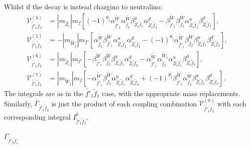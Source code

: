 \documentclass[final,3p,times,pdflatex]{elsarticle}
\begin{document}
Whilst if the decay is instead chargino to neutralino:
\begin{align}
\mathcal{V}_{\tilde{f'}_1 \tilde{f}_2}^{(4)} &= |m_{\tilde{Z}_i}| m_{f} \left[(-1)^{\theta_j}\alpha_{\tilde{f'}_1}^{\tilde{W}} \alpha_{\tilde{f}_2}^{\tilde{W}} \beta_{\tilde{Z}_i \tilde{f}_1}^{u} \alpha_{\tilde{Z}_i \tilde{f}_2}^{d} - \beta_{\tilde{f'}_1}^{\tilde{W}} \beta_{\tilde{f}_2}^{\tilde{W}} \alpha_{\tilde{Z}_i \tilde{f}_1}^{u} \beta_{\tilde{Z}_i \tilde{f}_2}^{d}\right] ,\\
\mathcal{V}_{\tilde{f'}_1 \tilde{f}_2}^{(5)} &= -|m_{\tilde{W}_j}|m_{f'} \left[\alpha_{\tilde{f}_2}^{\tilde{W}} \beta_{\tilde{f'}_1}^{\tilde{W}} \alpha_{\tilde{Z}_i \tilde{f}_1}^{u} \alpha_{\tilde{Z}_i \tilde{f}_2}^{d} -(-1)^{\theta_j} \alpha_{\tilde{f'}_1}^{\tilde{W}} \beta_{\tilde{f}_2}^{\tilde{W}} \beta_{\tilde{Z}_i \tilde{f}_1}^{u} \beta_{\tilde{Z}_i \tilde{f}_2}^{d}\right],\\
\mathcal{V}_{\tilde{f'}_1 \tilde{f}_2}^{(6)} &= |m_{\tilde{Z}_i}| m_{f'}\left[-\beta_{\tilde{f'}_1}^{\tilde{W}}\beta_{\tilde{f}_2}^{\tilde{W}} \beta_{\tilde{Z}_i \tilde{f}_1}^{u} \alpha_{\tilde{Z}_i \tilde{f}_2}^{d}  - \alpha_{\tilde{f'}_1}^{\tilde{W}} \alpha_{\tilde{f}_2}^{\tilde{W}_1} \alpha_{\tilde{Z}_i \tilde{f}_1}^{u} \beta_{\tilde{Z}_i \tilde{f}_2}^{d}\right], \\
\mathcal{V}_{\tilde{f'}_1 \tilde{f}_2}^{(7)} &= |m_{\tilde{W}_j}|m_{f}\left[-\alpha_{\tilde{f'}_1}^{\tilde{W}}\beta_{\tilde{f}_2}^{\tilde{W}} \alpha_{\tilde{Z}_i \tilde{f}_1}^{u} \alpha_{\tilde{Z}_i \tilde{f}_2}^{d} + (-1)^{\theta_j} \beta_{\tilde{f'}_1}^{\tilde{W}} \alpha_{\tilde{f}_2}^{\tilde{W}} \beta_{\tilde{Z}_i \tilde{f}_1}^{u} \beta_{\tilde{Z}_i \tilde{f}_2}^{d}\right].
\end{align}
The integrals are as in the $\tilde{f'}_1 \tilde{f}_1$ case, with the appropriate mass replacements. Similarly, $\Gamma_{\tilde{f'}_1 \tilde{f}_2}$ is just the product of each coupling combination $\mathcal{V}_{\tilde{f'}_1 \tilde{f}_2}^{(k)}$ with each corresponding integral $I_{\tilde{f'}_1 \tilde{f}_2}^{k}$.


\textbf{\underline{$\Gamma_{\tilde{f'}_2 \tilde{f}_1}$}}
\end{document}
